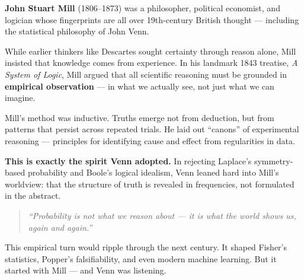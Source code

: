 \begin{tcolorbox}[colback=gray!5!white, colframe=black!75!white, title={Historical Sidebar: John Stuart Mill and the Logic of Observation}]

    \textbf{John Stuart Mill} (1806–1873) was a philosopher, political economist, and logician whose fingerprints are all over 19th-century British thought — including the statistical philosophy of John Venn.
    
    While earlier thinkers like Descartes sought certainty through reason alone, Mill insisted that knowledge comes from experience. In his landmark 1843 treatise, \emph{A System of Logic}, Mill argued that all scientific reasoning must be grounded in \textbf{empirical observation} — in what we actually see, not just what we can imagine.
    
    Mill’s method was inductive. Truths emerge not from deduction, but from patterns that persist across repeated trials. He laid out “canons” of experimental reasoning — principles for identifying cause and effect from regularities in data.
    
    \medskip
    
    \textbf{This is exactly the spirit Venn adopted.} In rejecting Laplace’s symmetry-based probability and Boole’s logical idealism, Venn leaned hard into Mill’s worldview: that the structure of truth is revealed in frequencies, not formulated in the abstract.
    
    \begin{quote}
    \emph{“Probability is not what we reason about — it is what the world shows us, again and again.”}
    \end{quote}
    
    This empirical turn would ripple through the next century. It shaped Fisher’s statistics, Popper’s falsifiability, and even modern machine learning. But it started with Mill — and Venn was listening.
    
\end{tcolorbox}
